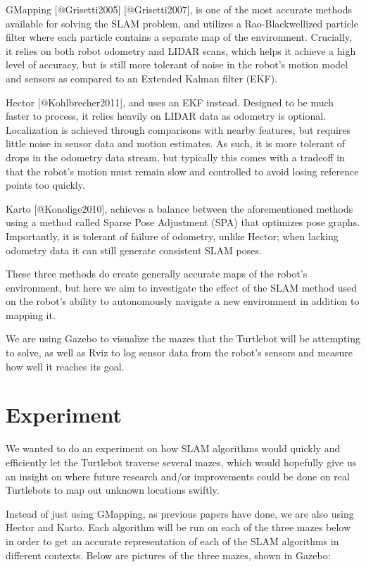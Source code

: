 \documentclass{article}
\begin{document}
GMapping [@Grisetti2005] [@Grisetti2007], is one of the most accurate methods available for solving the SLAM problem, and utilizes a Rao-Blackwellized particle filter where each particle contains a separate map of the environment. Crucially, it relies on both robot odometry and LIDAR scans, which helps it achieve a high level of accuracy, but is still more tolerant of noise in the robot's motion model and sensors as compared to an Extended Kalman filter (EKF).

Hector [@Kohlbrecher2011], and uses an EKF instead. Designed to be much faster to process, it relies heavily on LIDAR data as odometry is optional. Localization is achieved through comparisons with nearby features, but requires little noise in sensor data and motion estimates. As such, it is more tolerant of drops in the odometry data stream, but typically this comes with a tradeoff in that the robot's motion must remain slow and controlled to avoid losing reference points too quickly.

Karto [@Konolige2010], achieves a balance between the aforementioned methods using a method called Sparse Pose Adjustment (SPA) that optimizes pose graphs. Importantly, it is tolerant of failure of odometry, unlike Hector; when lacking odometry data it can still generate consistent SLAM poses.

These three methods do create generally accurate maps of the robot's environment, but here we aim to investigate the effect of the SLAM method used on the robot's ability to autonomously navigate a new environment in addition to mapping it.

We are using Gazebo to visualize the mazes that the Turtlebot will be attempting to solve, as well as Rviz to log sensor data from the robot's sensors and measure how well it reaches its goal. 

\section{Experiment}

We wanted to do an experiment on how SLAM algorithms would quickly and efficiently let the Turtlebot traverse several mazes, which would hopefully give us an insight on where future research and/or improvements could be done on real Turtlebots to map out unknown locations swiftly. 

Instead of just using GMapping, as previous papers have done, we are also using Hector and Karto. Each algorithm will be run on each of the three mazes below in order to get an accurate representation of each of the SLAM algorithms in different contexts. Below are pictures of the three mazes, shown in Gazebo:
\end{document}
